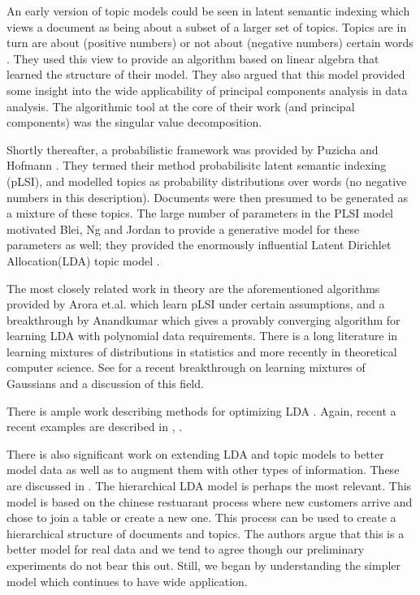 An early version of topic models could be seen in latent semantic
indexing which views a document as being about a subset of a larger
set of topics.  Topics are in turn are about (positive numbers) or not
about (negative numbers) certain words \cite{Papadimitriou1997}.  They
used this view to provide an algorithm based on linear algebra that
learned the structure of their model.  They also argued that this
model provided some insight into the wide applicability of principal
components analysis in data analysis. The algorithmic tool at the core
of their work (and principal components) was the singular value
decomposition.

Shortly thereafter, a probabilistic framework was provided by Puzicha
and Hofmann \cite{Hofmann04}.  They termed their method probabilisitc latent
semantic indexing (pLSI), and modelled topics as probability
distributions over words (no negative numbers in this description).
Documents were then presumed to be generated as a mixture of these
topics.  The large number of parameters in the PLSI model motivated
Blei, Ng and Jordan to provide a generative model for these parameters
as well; they provided the enormously influential Latent Dirichlet
Allocation(LDA) topic model \cite{Blei2003a}.

The most closely related work in theory are the aforementioned
algorithms provided by Arora et.al. \cite{Arora2012} which learn pLSI
under certain assumptions, and a breakthrough by
Anandkumar\cite{AnandLDA} which gives a provably converging algorithm
for learning LDA with polynomial data requirements.  There is a long
literature in learning mixtures of distributions in statistics and
more recently in theoretical computer science. See
\cite{MoitraValiant} for a recent breakthrough on learning mixtures of
Gaussians and a discussion of this field.

There is ample work describing methods for optimizing
LDA \cite{BleiCACM}.  Again, recent a recent examples are described
in \cite{MalletGibbs}, \cite{BleiCBA}. 

There is also significant work on extending LDA and topic models to
better model data as well as to augment them with other types of
information.  These are discussed in \cite{BleiCACM}.  The
hierarchical LDA model \cite{BleiCM} is perhaps the most relevant.
This model is based on the chinese restuarant process where new
customers arrive and chose to join a table or create a new one.  This
process can be used to create a hierarchical structure of documents
and topics. The authors argue that this is a better model for real
data and we tend to agree though our preliminary experiments do not
bear this out.  Still, we began by understanding the simpler model
which continues to have wide application.  

